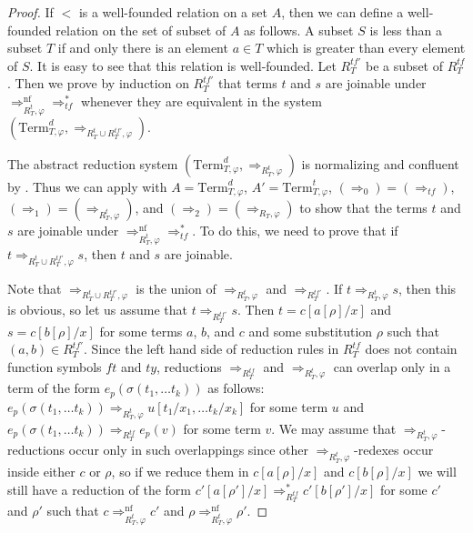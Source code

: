 \documentclass[reqno]{amsart}
\theoremstyle{definition}
\theoremstyle{remark}
\newcommand{\nf}{\mathrm{nf}}
\newcommand{\Term}{\mathrm{Term}}
\newcommand{\ft}{\mathit{ft}}
\newcommand{\ty}{\mathit{ty}}
\numberwithin{figure}{section}
\begin{document}
\begin{proof}
If $<$ is a well-founded relation on a set $A$, then we can define a well-founded relation on the set of subset of $A$ as follows.
A subset $S$ is less than a subset $T$ if and only there is an element $a \in T$ which is greater than every element of $S$.
It is easy to see that this relation is well-founded.
Let $R^{tf'}_T$ be a subset of $R^{tf}_T$.
Then we prove by induction on $R^{tf'}_T$ that terms $t$ and $s$ are joinable under $\Rightarrow_{R_T^t,\varphi}^\nf \Rightarrow_{tf}^*$
whenever they are equivalent in the system $(\Term_{T,\varphi}^d,\Rightarrow_{R^t_T \cup R^{tf'}_T, \varphi})$.

The abstract reduction system $(\Term_{T,\varphi}^d,\Rightarrow_{R^t_T,\varphi})$ is normalizing and confluent by .
Thus we can apply  with $A = \Term^d_{T,\varphi}$, $A' = \Term^t_{T,\varphi}$, $(\Rightarrow_0) = (\Rightarrow_{tf})$, $(\Rightarrow_1) = (\Rightarrow_{R^t_T,\varphi})$, and $(\Rightarrow_2) = (\Rightarrow_{R_T,\varphi})$
to show that the terms $t$ and $s$ are joinable under $\Rightarrow_{R_T^t,\varphi}^\nf \Rightarrow_{tf}^*$.
To do this, we need to prove that if $t \Rightarrow_{R^t_T \cup R^{tf'}_T, \varphi} s$, then $t$ and $s$ are joinable.

Note that $\Rightarrow_{R^t_T \cup R^{tf'}_T, \varphi}$ is the union of $\Rightarrow_{R^t_T,\varphi}$ and $\Rightarrow_{R^{tf'}_T}$.
If $t \Rightarrow_{R^t_T,\varphi} s$, then this is obvious, so let us assume that $t \Rightarrow_{R^{tf'}_T} s$.
Then $t = c[a[\rho]/x]$ and $s = c[b[\rho]/x]$ for some terms $a$, $b$, and $c$ and some substitution $\rho$ such that $(a,b) \in R^{tf'}_T$.
Since the left hand side of reduction rules in $R_T^{tf}$ does not contain function symbols $\ft$ and $\ty$,
reductions $\Rightarrow_{R_T^{tf}}$ and $\Rightarrow_{R_T^t,\varphi}$ can overlap only in a term of the form $e_p(\sigma(t_1, \ldots t_k))$ as follows:
$e_p(\sigma(t_1, \ldots t_k)) \Rightarrow_{R_T^t,\varphi} u[t_1/x_1, \ldots t_k/x_k]$ for some term $u$ and $e_p(\sigma(t_1, \ldots t_k)) \Rightarrow_{R_T^{tf}} e_p(v)$ for some term $v$.
We may assume that $\Rightarrow_{R_T^t,\varphi}$-reductions occur only in such overlappings since other $\Rightarrow_{R_T^t,\varphi}$-redexes occur inside either $c$ or $\rho$, so if we reduce them in $c[a[\rho]/x]$ and $c[b[\rho]/x]$
we will still have a reduction of the form $c'[a[\rho']/x] \Rightarrow_{R_T^{tf}}^* c'[b[\rho']/x]$ for some $c'$ and $\rho'$ such that $c \Rightarrow_{R_T^t,\varphi}^\nf c'$ and $\rho \Rightarrow_{R_T^t,\varphi}^\nf \rho'$.


\end{proof}
\end{document}
